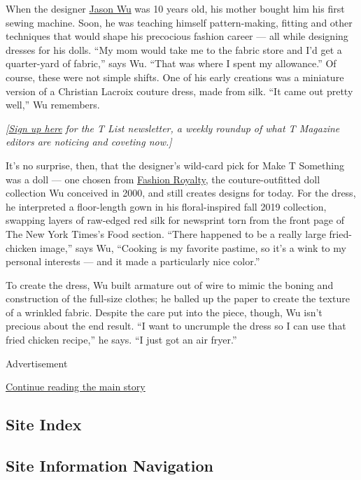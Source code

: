 When the designer \href{https://www.jasonwustudio.com/}{Jason Wu} was 10
years old, his mother bought him his first sewing machine. Soon, he was
teaching himself pattern-making, fitting and other techniques that would
shape his precocious fashion career --- all while designing dresses for
his dolls. ``My mom would take me to the fabric store and I'd get a
quarter-yard of fabric,'' says Wu. ``That was where I spent my
allowance.'' Of course, these were not simple shifts. One of his early
creations was a miniature version of a Christian Lacroix couture dress,
made from silk. ``It came out pretty well,'' Wu remembers.

\emph{{[}}\href{https://www.nytimes3xbfgragh.onion/newsletters/t-list?module=inline}{\emph{Sign
up here}} \emph{for the T List newsletter, a weekly roundup of what T
Magazine editors are noticing and coveting now.{]}}

It's no surprise, then, that the designer's wild-card pick for Make T
Something was a doll --- one chosen from
\href{https://www.integritytoys.com/brands/fashion-royalty/fashion-royalty-2019/}{Fashion
Royalty}, the couture-outfitted doll collection Wu conceived in 2000,
and still creates designs for today. For the dress, he interpreted a
floor-length gown in his floral-inspired fall 2019 collection, swapping
layers of raw-edged red silk for newsprint torn from the front page of
The New York Times's Food section. ``There happened to be a really large
fried-chicken image,'' says Wu, ``Cooking is my favorite pastime, so
it's a wink to my personal interests --- and it made a particularly nice
color.''

To create the dress, Wu built armature out of wire to mimic the boning
and construction of the full-size clothes; he balled up the paper to
create the texture of a wrinkled fabric. Despite the care put into the
piece, though, Wu isn't precious about the end result. ``I want to
uncrumple the dress so I can use that fried chicken recipe,'' he says.
``I just got an air fryer.''

Advertisement

\protect\hyperlink{after-bottom}{Continue reading the main story}

\hypertarget{site-index}{%
\subsection{Site Index}\label{site-index}}

\hypertarget{site-information-navigation}{%
\subsection{Site Information
Navigation}\label{site-information-navigation}}

